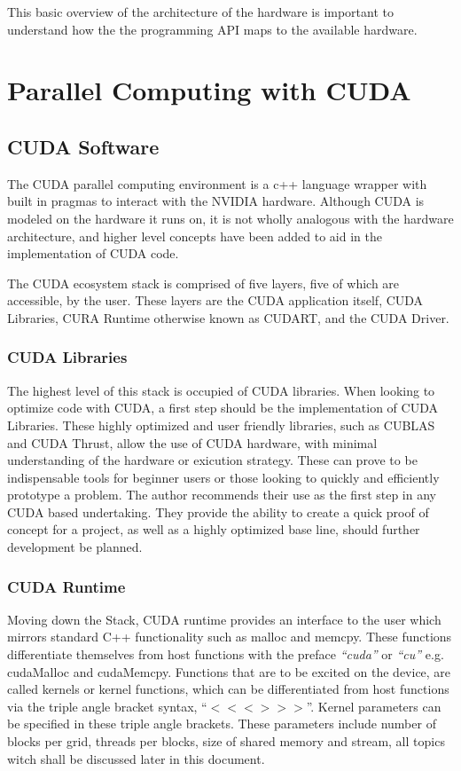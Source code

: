 This basic overview of the architecture of the hardware is important to understand
how the the programming API maps to the available hardware.

\section{Parallel Computing with CUDA}
\subsection{CUDA Software}

The CUDA parallel computing environment is a c++ language wrapper with built in
pragmas to interact with the NVIDIA hardware.  Although CUDA is modeled on the
hardware it runs on, it is not wholly analogous with the hardware architecture,
and higher level concepts have been added to aid in the implementation of CUDA code.
\par
 The CUDA ecosystem stack is comprised of five layers, five of which are accessible, by the user.
These layers are the CUDA application itself, CUDA Libraries, CURA Runtime otherwise
known as CUDART, and the CUDA Driver.


\subsubsection{CUDA Libraries}

The highest level of this stack is occupied
of CUDA libraries. When looking to optimize code with CUDA, a
first step should be the implementation of CUDA Libraries.  These highly optimized
and user friendly libraries, such as CUBLAS and CUDA Thrust, allow the use of
CUDA hardware, with minimal understanding of the hardware or exicution strategy.  These can prove
to be indispensable tools for beginner users or those looking to quickly and
efficiently prototype a problem. The author recommends their use as the first step
in any CUDA based undertaking. They provide the ability to create a quick proof
of concept for a project, as well as a highly optimized base line, should further
development be planned.
\subsubsection{CUDA Runtime}

Moving down the Stack, CUDA runtime provides an interface to the user which mirrors
standard C++ functionality such as malloc and memcpy.  These functions differentiate
themselves from host functions with the preface \textit{``cuda''} or \textit{``cu''}
e.g. cudaMalloc and cudaMemcpy.  Functions that are to be excited on the
device, are called kernels or kernel functions, which can be differentiated from
host functions via the triple angle bracket syntax, ``$<<< >>>$''.
Kernel parameters can be specified in these triple angle brackets.  These parameters
include number of blocks per grid, threads per blocks, size of shared memory and
stream, all topics witch shall be discussed later in this document. %

